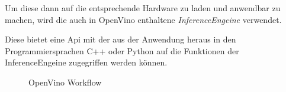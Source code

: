 Um diese dann auf die entsprechende Hardware zu laden und anwendbar 
zu machen, wird die auch in OpenVino enthaltene
\textit{InferenceEngeine} verwendet.

Diese bietet eine Api mit der aus der Anwendung heraus in den 
Programmiersprachen C++ oder Python auf die Funktionen der 
InferenceEngeine zugegriffen werden können.



\begin{figure}[H]
    \centering
    \def\svgwidth{0.8\textwidth}
    
    \caption{OpenVino Workflow}
    \label{fig:openvinoflow}
\end{figure}



